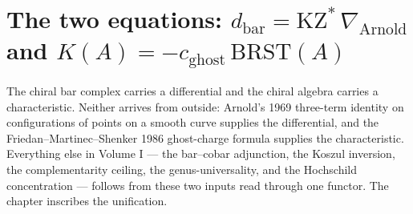 %
%

\chapter[The two equations]{The two equations: \(d_{\mathrm{bar}} = \mathrm{KZ}^{*}\,\nabla_{\mathrm{Arnold}}\) and \(K(A) = -c_{\mathrm{ghost}}\,\mathrm{BRST}(A)\)}
\label{ch:climax-two-equations}

\providecommand{\KZ}{\mathrm{KZ}}
\providecommand{\Arn}{\nabla_{\mathrm{Arnold}}}
\providecommand{\dbar}{d_{\mathrm{bar}}}
\providecommand{\cghost}{c_{\mathrm{ghost}}}
\providecommand{\BRST}{\mathrm{BRST}}
\providecommand{\Bord}{B^{\mathrm{ord}}}
\providecommand{\ChirAlgInf}{\ChirAlg^{E_{\infty}}}
\providecommand{\HH}{\mathrm{HH}}
\providecommand{\Vir}{\mathrm{Vir}}
\providecommand{\Heis}{\mathcal{H}}
\providecommand{\DS}{\mathrm{DS}}
\providecommand{\KSDual}{\mathrm{KSDual}}
\providecommand{\Deldual}{\mathbb{D}}
\providecommand{\Hom}{\mathrm{Hom}}

The chiral bar complex carries a differential and the chiral algebra
carries a characteristic. Neither arrives from outside: Arnold's 1969
three-term identity on configurations of points on a smooth curve
supplies the differential, and the Friedan--Martinec--Shenker 1986
ghost-charge formula supplies the characteristic. Everything else in
Volume I --- the bar--cobar adjunction, the Koszul inversion, the
complementarity ceiling, the genus-universality, and the Hochschild
concentration --- follows from these two inputs read through one
functor. The chapter inscribes the unification.

